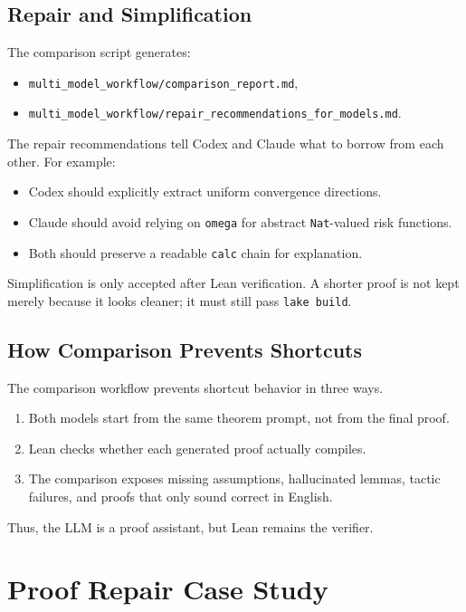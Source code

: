 \documentclass[11pt]{article}
\theoremstyle{definition}
\begin{document}
\subsection{Repair and Simplification}

The comparison script generates:
\begin{itemize}[leftmargin=*]
  \item \texttt{multi\_model\_workflow/comparison\_report.md},
  \item \texttt{multi\_model\_workflow/repair\_recommendations\_for\_models.md}.
\end{itemize}

The repair recommendations tell Codex and Claude what to borrow from each other.
For example:
\begin{itemize}[leftmargin=*]
  \item Codex should explicitly extract uniform convergence directions.
  \item Claude should avoid relying on \texttt{omega} for abstract
  \texttt{Nat}-valued risk functions.
  \item Both should preserve a readable \texttt{calc} chain for explanation.
\end{itemize}

Simplification is only accepted after Lean verification. A shorter proof is not
kept merely because it looks cleaner; it must still pass \texttt{lake build}.

\subsection{How Comparison Prevents Shortcuts}

The comparison workflow prevents shortcut behavior in three ways.

\begin{enumerate}[leftmargin=*]
  \item Both models start from the same theorem prompt, not from the final proof.
  \item Lean checks whether each generated proof actually compiles.
  \item The comparison exposes missing assumptions, hallucinated lemmas, tactic
  failures, and proofs that only sound correct in English.
\end{enumerate}

Thus, the LLM is a proof assistant, but Lean remains the verifier.

\section{Proof Repair Case Study}
\end{document}

